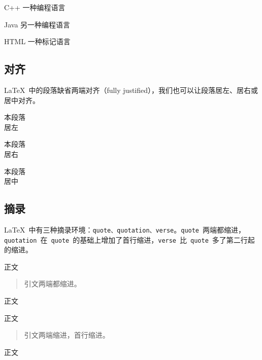 \begin{demo}
\begin{description}
    \item{C++} 一种编程语言
    \item{Java} 另一种编程语言
    \item{HTML} 一种标记语言
\end{description}
\end{demo}

\subsection{对齐}
\LaTeX~中的段落缺省两端对齐（fully justified），我们也可以让段落居左、居右或居中对齐。

\begin{demo}
\begin{flushleft}
本段落\\
居左
\end{flushleft}
\end{demo}

\begin{demo}
\begin{flushright}
本段落\\
居右
\end{flushright}
\end{demo}

\begin{demo}
\begin{center}
本段落\\
居中
\end{center}
\end{demo}

\subsection{摘录}
\LaTeX~中有三种摘录环境：\verb|quote、quotation、verse|。\verb|quote|~两端都缩进，\verb|quotation|~在~\verb|quote|~的基础上增加了首行缩进，\verb|verse|~比~\verb|quote|~多了第二行起的缩进。

\begin{demo}
正文
\begin{quote}
引文两端都缩进。
\end{quote}
正文
\end{demo}

\begin{demo}
正文
\begin{quotation}
引文两端缩进，首行缩进。
\end{quotation}
正文
\end{demo}

